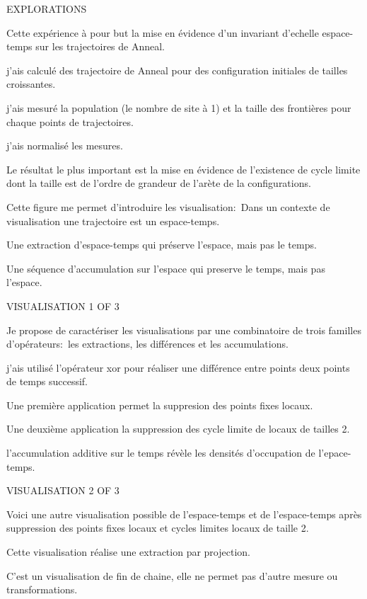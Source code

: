 \documentclass[a4paper]{slides}
\newcommand{\mytitle}[1]{\begin{center}\begin{large}#1\end{large}\end{center}}
\begin{document}
\begin{slide}
  \mytitle{EXPLORATIONS}
  \begin{footnotesize}
    Cette exp\'erience \`a pour but la mise en \'evidence d'un invariant
    d'echelle espace-temps sur les trajectoires de Anneal.
    
    j'ais calcul\'e des trajectoire de Anneal pour des configuration initiales de
    tailles croissantes.
    
    j'ais mesur\'e la population (le nombre de site \`a 1) et la taille des
    fronti\`eres pour chaque points de trajectoires.
    
    j'ais normalis\'e les mesures.
    
    Le r\'esultat le plus important est la mise en \'evidence de l'existence
    de cycle limite dont la taille est de l'ordre de grandeur de l'ar\`ete
    de la configurations.
    
    Cette figure me permet d'introduire les visualisation:\
    Dans un contexte de visualisation une trajectoire est un espace-temps.
    
    Une extraction d'espace-temps qui pr\'eserve l'espace, mais pas le
    temps.
    
    Une s\'equence d'accumulation sur l'espace qui preserve le temps, mais
    pas l'espace.
  \end{footnotesize}
\end{slide}

\begin{slide}
  \mytitle{VISUALISATION 1 OF 3}

  Je propose de caract\'eriser les visualisations par une combinatoire
  de trois familles d'op\'erateurs:~les extractions, les diff\'erences et
  les accumulations.
  
  j'ais utilis\'e l'op\'erateur xor pour r\'ealiser une diff\'erence entre
  points deux points de temps successif.
  
  Une premi\`ere application permet la suppresion des points fixes
  locaux.
  
  Une deuxi\`eme application la suppression des cycle limite de locaux de
  tailles 2.
  
  l'accumulation additive sur le temps r\'ev\`ele les densit\'es d'occupation
  de l'epace-temps.
\end{slide}

\begin{slide}
  \mytitle{VISUALISATION 2 OF 3}
  
  Voici une autre visualisation possible de l'espace-temps et de
  l'espace-temps apr\`es suppression des points fixes locaux et cycles
  limites locaux de taille 2.
  
  Cette visualisation r\'ealise une extraction par projection.
  
  C'est un visualisation de fin de chaine, elle ne permet pas d'autre
  mesure ou transformations.
\end{slide}
\end{document}

